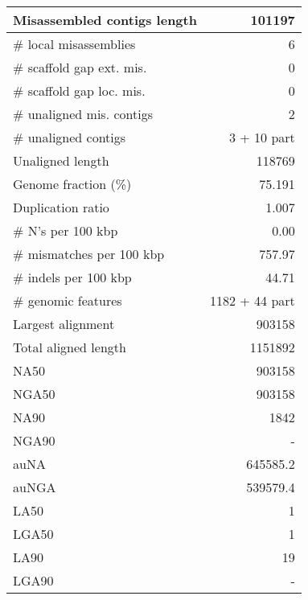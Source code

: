 \documentclass[12pt,a4paper]{article}
\begin{document}
\begin{table}[ht]
\begin{center}
\begin{tabular}{|l*{1}{|r}|}
Misassembled contigs length & 101197 \\ \hline
\# local misassemblies & 6 \\ \hline
\# scaffold gap ext. mis. & 0 \\ \hline
\# scaffold gap loc. mis. & 0 \\ \hline
\# unaligned mis. contigs & 2 \\ \hline
\# unaligned contigs & 3 + 10 part \\ \hline
Unaligned length & 118769 \\ \hline
Genome fraction (\%) & 75.191 \\ \hline
Duplication ratio & 1.007 \\ \hline
\# N's per 100 kbp & 0.00 \\ \hline
\# mismatches per 100 kbp & 757.97 \\ \hline
\# indels per 100 kbp & 44.71 \\ \hline
\# genomic features & 1182 + 44 part \\ \hline
Largest alignment & 903158 \\ \hline
Total aligned length & 1151892 \\ \hline
NA50 & 903158 \\ \hline
NGA50 & 903158 \\ \hline
NA90 & 1842 \\ \hline
NGA90 & - \\ \hline
auNA & 645585.2 \\ \hline
auNGA & 539579.4 \\ \hline
LA50 & 1 \\ \hline
LGA50 & 1 \\ \hline
LA90 & 19 \\ \hline
LGA90 & - \\ \hline
\end{tabular}
\end{center}
\end{table}
\end{document}
